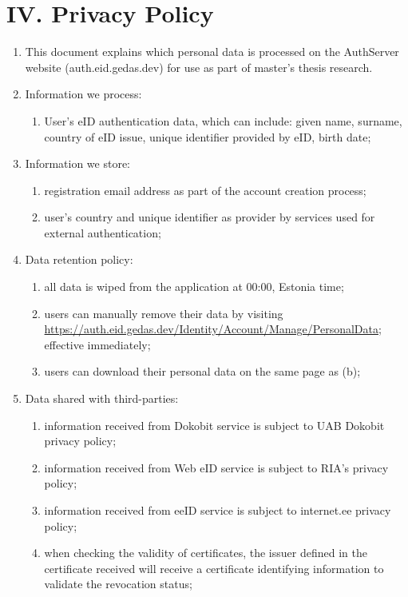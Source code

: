 \section*{IV. Privacy Policy}

\begin{enumerate}
    \item This document explains which personal data is processed on the AuthServer website (auth.eid.gedas.dev) for use as part of master's thesis research.
    \item Information we process:
    \begin{enumerate}
        \item User's eID authentication data, which can include: given name, surname, country of eID issue, unique identifier provided by eID, birth date;
    \end{enumerate}
    \item Information we store:
    \begin{enumerate}
        \item registration email address as part of the account creation process;
        \item user's country and unique identifier as provider by services used for external authentication;
    \end{enumerate}
    \item Data retention policy:
    \begin{enumerate}
        \item all data is wiped from the application at 00:00, Estonia time;
        \item users can manually remove their data by visiting \url{https://auth.eid.gedas.dev/Identity/Account/Manage/PersonalData}; effective immediately;
        \item users can download their personal data on the same page as (b);
    \end{enumerate}
    \item Data shared with third-parties:
    \begin{enumerate}
        \item information received from Dokobit service is subject to UAB Dokobit privacy policy;
        \item information received from Web eID service is subject to RIA's privacy policy;
        \item information received from eeID service is subject to internet.ee privacy policy;
        \item when checking the validity of certificates, the issuer defined in the certificate received will receive a certificate identifying information to validate the revocation status;
    \end{enumerate}
\end{enumerate}
